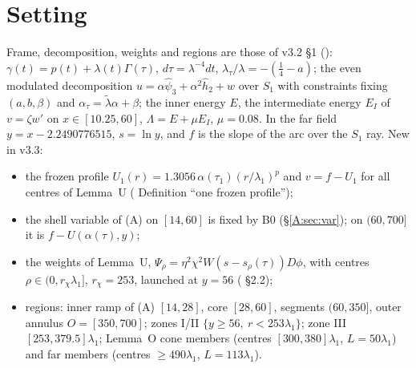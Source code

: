 \documentclass[11pt]{article}
\begin{document}
\section{Setting}\label{M:sec:set}
Frame, decomposition, weights and regions are those of v3.2 \S1 (): $\gamma(t)=p(t)+\lambda(t)\Gamma(\tau)$, $d\tau=\lambda^{-4}dt$, $\lambda_\tau/\lambda=-(\frac14-a)$; the even modulated decomposition $u=\alpha\hat\psi_3+\alpha^2\hat h_2+w$ over $S_1$ with constraints fixing $(a,b,\beta)$ and $\alpha_\tau=\tilde\lambda\alpha+\beta$; the inner energy $E$, the intermediate energy $E_I$ of $v=\zeta w'$ on $x\in[10.25,60]$, $\Lambda=E+\mu E_I$, $\mu=0.08$. In the far field $y=x-2.2490776515$, $s=\ln y$, and $f$ is the slope of the arc over the $S_1$ ray. New in v3.3:
\begin{itemize}[leftmargin=*]
\item the frozen profile $U_1(r)=1.3056\,\alpha(\tau_1)(r/\lambda_1)^p$ and $v=f-U_1$ for all centres of Lemma~U ( Definition ``one frozen profile'');
\item the shell variable of (A) on $[14,60]$ is fixed by B0 (\S\ref{A:sec:var}); on $(60,700]$ it is $f-U(\alpha(\tau),y)$;
\item the weights of Lemma~U, $\Psi_\rho=\eta^2\chi^2W(s-s_\rho(\tau))D\phi$, with centres $\rho\in(0,r_\chi\lambda_1]$, $r_\chi=253$, launched at $y=56$ ( \S2.2);
\item regions: inner ramp of (A) $[14,28]$, core $[28,60]$, segments $(60,350]$, outer annulus $O=[350,700]$; zones I/II $\{y\ge56,\ r<253\lambda_1\}$; zone III $[253,379.5]\lambda_1$; Lemma~O cone members (centres $[300,380]\lambda_1$, $L=50\lambda_1$) and far members (centres $\ge490\lambda_1$, $L=113\lambda_1$).
\end{itemize}

\end{document}
